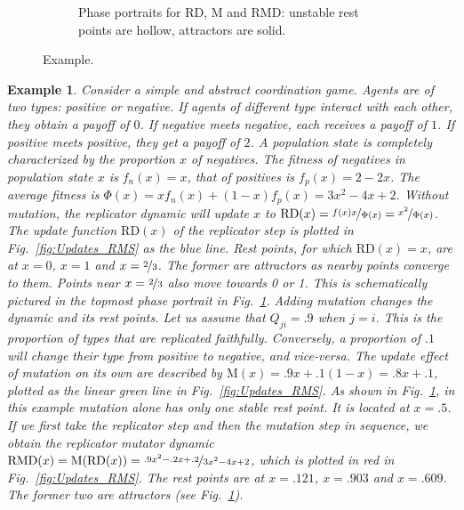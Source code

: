 \documentclass[a4paper, 11pt]{article}
\theoremstyle{Satz}
\newtheorem{example}{Example}
\begin{document}
\begin{figure}[t]
\begin{subfigure}[b]{0.5\textwidth}
        


    \caption{Phase portraits for RD, M and RMD: unstable rest points are hollow, attractors are
      solid.}
        \label{fig:Phase_RD}
    \end{subfigure}

  \caption{Example.}
  \label{fig:Example_RMD}
\end{figure}

\begin{example}
  Consider a simple and abstract coordination game. Agents are of two types: positive or negative. If
  agents of different type interact with each other, they obtain a payoff of $0$. If negative meets
  negative, each receives a payoff of $1$. If positive meets positive, they get a payoff of $2$.  A population state is completely characterized by the proportion $x$ of negatives. The fitness
  of negatives in population state $x$ is $f_n(x) = x$, that of positives is $f_p(x) = 2-2x$.
  The average fitness is $\Phi(x) = x f_n(x) + (1-x) f_p(x) = 3x^2 - 4x + 2$. Without mutation,
  the replicator dynamic will update $x$ to $\text{RD}(x) = \nicefrac{f(x)x}{\Phi(x)} = \nicefrac{x^2}{\Phi(x)}$. The update
  function $\text{RD}(x)$ of the replicator step is plotted in Fig.~\ref{fig:Updates_RMS} as the
  blue line. Rest points, for which $\text{RD}(x)=x$, are at $x=0$, $x=1$ and $x= \nicefrac{2}{3}$.
  The former are attractors as nearby points converge to them. Points near $x=\nicefrac{2}{3}$
  also move towards 0 or 1. This is schematically pictured in the topmost phase portrait in
  Fig.~\ref{fig:Phase_RD}. Adding mutation changes the dynamic and its rest points. Let us assume that $Q_{ji} = .9$
  when $j=i$. This is the proportion of types that are replicated faithfully. Conversely, a proportion of $.1$ will change their type from positive to negative, and vice-versa. The update effect of mutation on its own are described by $\text{M}(x) = .9 x + .1 (1-x) = .8x + .1$, plotted as the linear green line in Fig.~\ref{fig:Updates_RMS}. As shown in Fig.~\ref{fig:Phase_RD}, in this example mutation alone has only one stable rest point. It is located at $x = .5$. If we first take the replicator step and
  then the mutation step in sequence, we obtain the replicator mutator dynamic
  $\text{RMD}(x) = \text{M}(\text{RD}(x)) = \nicefrac{.9x^2 - .2x +.2}{3x^2 - 4x + 2}$, which is plotted in red in
  Fig.~\ref{fig:Updates_RMS}. The rest points are at $x=.121$, $x=.903$ and $x=.609$. The
  former two are attractors (see Fig.~\ref{fig:Phase_RD}).
\end{example}
\end{document}
